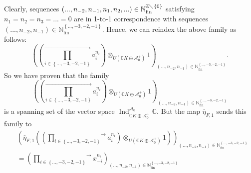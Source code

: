 \documentclass
[numbers=enddot,12pt,final,onecolumn,german,notitlepage]{scrartcl}%
\theoremstyle{definition}
\begin{document}
Clearly, sequences $\left(  ...,n_{-2},n_{-1},n_{1},n_{2},...\right)
\in\mathbb{N}_{\operatorname*{fin}}^{\mathbb{Z}\diagdown\left\{  0\right\}  }$
satisfying $n_{1}=n_{2}=n_{3}=...=0$ are in 1-to-1 correspondence with
sequences $\left(  ...,n_{-2},n_{-1}\right)  \in\mathbb{N}%
_{\operatorname*{fin}}^{\left\{  ...,-3,-2,-1\right\}  }$. Hence, we can
reindex the above family as follows:
\[
\left(  \left(  \overset{\rightarrow}{\prod\limits_{i\in\left\{
...,-3,-2,-1\right\}  }}a_{i}^{n_{i}}\right)  \otimes_{U\left(  \mathbb{C}%
K\oplus\mathcal{A}_{0}^{+}\right)  }1\right)  _{\left(  ...,n_{-2}%
,n_{-1}\right)  \in\mathbb{N}_{\operatorname*{fin}}^{\left\{
...,-3,-2,-1\right\}  }}.
\]
So we have proven that the family%
\[
\left(  \left(  \overset{\rightarrow}{\prod\limits_{i\in\left\{
...,-3,-2,-1\right\}  }}a_{i}^{n_{i}}\right)  \otimes_{U\left(  \mathbb{C}%
K\oplus\mathcal{A}_{0}^{+}\right)  }1\right)  _{\left(  ...,n_{-2}%
,n_{-1}\right)  \in\mathbb{N}_{\operatorname*{fin}}^{\left\{
...,-3,-2,-1\right\}  }}%
\]
is a spanning set of the vector space $\operatorname*{Ind}%
\nolimits_{\mathbb{C}K\oplus\mathcal{A}_{0}^{+}}^{\mathcal{A}_{0}}\mathbb{C}$.
But the map $\overline{\eta}_{F,1}$ sends this family to%
\begin{align*}
&  \left(  \overline{\eta}_{F,1}\left(  \left(  \overset{\rightarrow
}{\prod\limits_{i\in\left\{  ...,-3,-2,-1\right\}  }}a_{i}^{n_{i}}\right)
\otimes_{U\left(  \mathbb{C}K\oplus\mathcal{A}_{0}^{+}\right)  }1\right)
\right)  _{\left(  ...,n_{-2},n_{-1}\right)  \in\mathbb{N}%
_{\operatorname*{fin}}^{\left\{  ...,-3,-2,-1\right\}  }}\\
&  =\left(  \overset{\rightarrow}{\prod\limits_{i\in\left\{
...,-3,-2,-1\right\}  }}x_{-i}^{n_{i}}\right)  _{\left(  ...,n_{-2}%
,n_{-1}\right)  \in\mathbb{N}_{\operatorname*{fin}}^{\left\{
...,-3,-2,-1\right\}  }}%
\end{align*}
\end{document}
